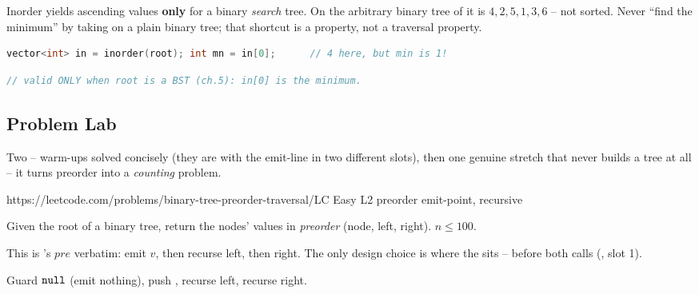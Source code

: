 \begin{warningbox}
Inorder yields ascending values \textbf{only} for a binary \emph{search} tree. On the
arbitrary binary tree of  it is $4,2,5,1,3,6$ -- not sorted. Never
``find the minimum'' by taking  on a plain binary tree; that shortcut is a
 property, not a traversal property.
\end{warningbox}
\begin{lstlisting}[caption={\textcolor{warningred}{WRONG}: inorder[0] is NOT the min of a general tree}, language=C++, basicstyle=\ttfamily\small]
vector<int> in = inorder(root); int mn = in[0];      // 4 here, but min is 1!
\end{lstlisting}
\begin{lstlisting}[caption={\textcolor{successgreen}{RIGHT}: the sorted-inorder claim needs a BST}, language=C++, basicstyle=\ttfamily\small]
// valid ONLY when root is a BST (ch.5): in[0] is the minimum.
\end{lstlisting}


\subsection{Problem Lab}

Two -- warm-ups solved concisely (they are  with the
emit-line in two different slots), then one genuine  stretch that never builds a
tree at all -- it turns preorder into a \emph{counting} problem.

  {https://leetcode.com/problems/binary-tree-preorder-traversal/}{LC Easy L2}
  {preorder emit-point, recursive}

\begin{problemstatement}
Given the root of a binary tree, return the nodes' values in \emph{preorder}
(node, left, right). $n \le 100$.
\end{problemstatement}

This is 's $\mathit{pre}$ verbatim: emit $v$, then recurse
left, then right. The only design choice is where the  sits -- before
both calls (, slot 1).

Guard $\texttt{null}$ (emit nothing), push , recurse left, recurse right.

